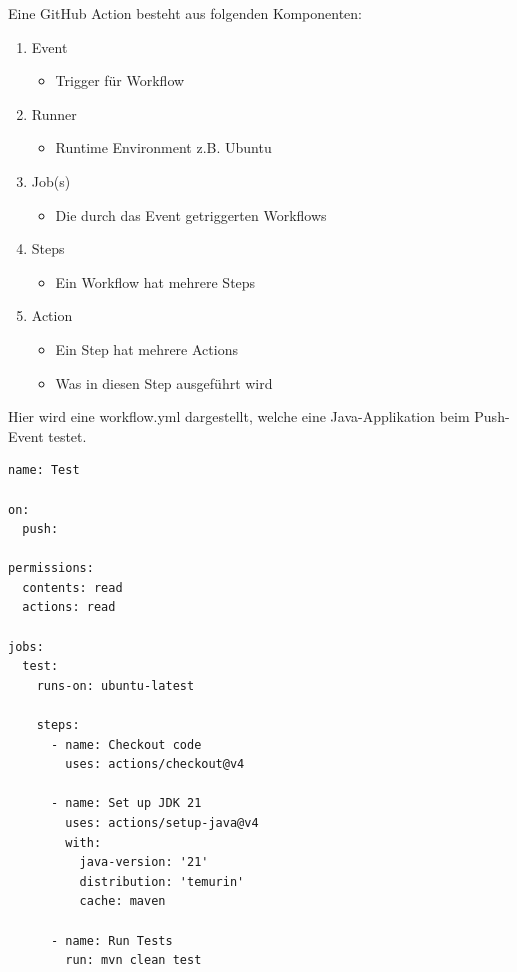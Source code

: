 \documentclass[
    headings=optiontotocandhead,%
    twoside,
    numbers=noenddot,%
    12pt, %
    titlepage, %
    parskip=full, %
    listof=leveldown, 
    numbers=noenddot, %
    a4paper,DIV=14,
    BCOR=15mm,
]{scrbook}
\providecommand{\tightlist}{%
  \setlength{\itemsep}{0pt}\setlength{\parskip}{0pt}}
\begin{document}
Eine GitHub Action besteht aus folgenden Komponenten:

\begin{enumerate}
\def\labelenumi{\arabic{enumi}.}
\tightlist
\item
  Event

  \begin{itemize}
  \tightlist
  \item
    Trigger für Workflow
  \end{itemize}
\item
  Runner

  \begin{itemize}
  \tightlist
  \item
    Runtime Environment z.B. Ubuntu
  \end{itemize}
\item
  Job(s)

  \begin{itemize}
  \tightlist
  \item
    Die durch das Event getriggerten Workflows
  \end{itemize}
\item
  Steps

  \begin{itemize}
  \tightlist
  \item
    Ein Workflow hat mehrere Steps
  \end{itemize}
\item
  Action

  \begin{itemize}
  \tightlist
  \item
    Ein Step hat mehrere Actions
  \item
    Was in diesen Step ausgeführt wird
  \end{itemize}
\end{enumerate}

Hier wird eine workflow.yml dargestellt, welche eine Java-Applikation
beim Push-Event testet.

\begin{lstlisting}[caption={Beispiel einer GitHub Action}]
name: Test

on:
  push:

permissions:
  contents: read
  actions: read

jobs:
  test:
    runs-on: ubuntu-latest

    steps:
      - name: Checkout code
        uses: actions/checkout@v4

      - name: Set up JDK 21
        uses: actions/setup-java@v4
        with:
          java-version: '21'
          distribution: 'temurin'
          cache: maven

      - name: Run Tests
        run: mvn clean test
\end{lstlisting}
\end{document}

